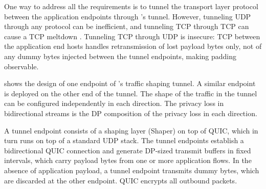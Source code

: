 One way to address all the requirements is to tunnel the transport layer
protocol between the application endpoints through {\sys}'s tunnel.
However, tunneling UDP through any protocol can be inefficient,
and tunneling
TCP through TCP can cause a TCP meltdown \cite{honda2005tcpovertcp,
tcp-meltdown}.
Tunneling TCP through UDP is insecure: TCP between the application end hosts
handles retransmission of lost payload bytes only,
not of any dummy bytes injected between the tunnel endpoints, making padding
observable.
\fi


 shows the design of one endpoint of {\sys}’s
traffic shaping tunnel. A similar endpoint is deployed on the other end of
the tunnel.
%
{The shape of the traffic in the tunnel can be configured independently
in each direction. The privacy loss in bidirectional streams is the DP
composition of the privacy loss in each direction.}

A tunnel endpoint consists of a shaping layer (Shaper) on top of QUIC, which
in turn runs on top of a standard UDP stack.
The tunnel endpoints establish a
bidirectional QUIC connection and generate DP-sized transmit buffers in fixed
intervals, which carry payload bytes from one or more application flows. In the
absence of application payload, a tunnel endpoint transmits dummy bytes, which
are discarded at the other endpoint. QUIC encrypts all outbound packets.

